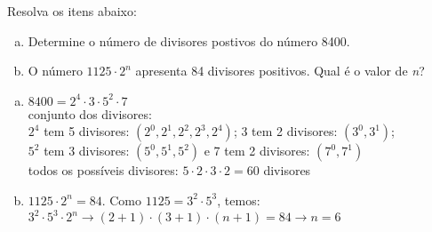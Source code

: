 \begin{ex}
Resolva os itens abaixo:
   \begin{enumerate}[(a)]
   \item Determine o número de divisores postivos do número 8400.
   \item O número $1125\cdot2 ^ n$ apresenta 84 divisores positivos. Qual é o valor de \textit{n}?
   \end{enumerate}
     \begin{sol}
       \phantom{A} 
         \begin{enumerate} [(a)]
             \item $8400=2^4\cdot3\cdot5^2\cdot7$\\
             conjunto dos divisores:\\
             $2^4$ tem 5 divisores: $(2^0, 2^1, 2^2, 2^3, 2^4)$; 3 tem 2 divisores: $(3^0,3^1)$;\\  $5^2$ tem 3 divisores: $(5^0,5^1,5^2)$ e 7 tem 2 divisores: $(7^0,7^1)$ \\
             todos os possíveis divisores: $5\cdot2\cdot3\cdot2=60$ divisores
             \item $1125\cdot2^n = 84$. Como $1125=3^2\cdot5^3$, temos: \\
             $3^2\cdot5^3\cdot2^n \longrightarrow (2+1)\cdot(3+1)\cdot(n+1)=84 \longrightarrow n=6$
         \end{enumerate}
     \end{sol}
\end{ex}